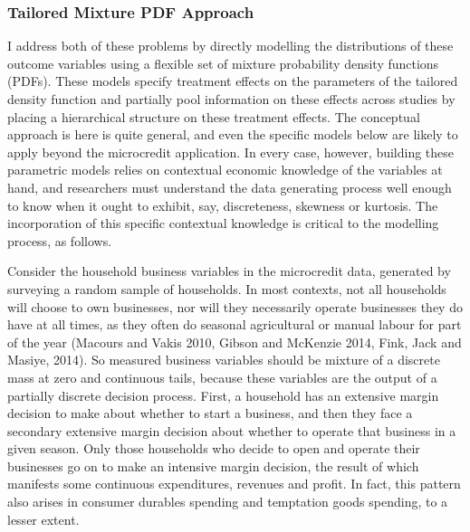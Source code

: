 \documentclass[english,12pt]{article}\usepackage{lmodern}
\numberwithin{equation}{section}
\begin{document}
\subsubsection{Tailored Mixture PDF Approach}
I address both of these problems by directly modelling the distributions of these outcome variables using a flexible set of mixture probability density functions (PDFs). These models specify treatment effects on the parameters of the tailored density function and partially pool information on these effects across studies by placing a hierarchical structure on these treatment effects. The conceptual approach is here is quite general, and even the specific models below are likely to apply beyond the microcredit application. In every case, however, building these parametric models relies on contextual economic knowledge of the variables at hand, and researchers must understand the data generating process well enough to know when it ought to exhibit, say, discreteness, skewness or kurtosis. The incorporation of this specific contextual knowledge is critical to the modelling process, as follows. 

Consider the household business variables in the microcredit data, generated by surveying a random sample of households. In most contexts, not all households will choose to own businesses, nor will they necessarily operate businesses they do have at all times, as they often do seasonal agricultural or manual labour for part of the year (Macours and Vakis 2010, Gibson and McKenzie 2014, Fink, Jack and Masiye, 2014). So measured business variables should be mixture of a discrete mass at zero and continuous tails, because these variables are the output of a partially discrete decision process. First, a household has an extensive margin decision to make about whether to start a business, and then they face a secondary extensive margin decision about whether to operate that business in a given season. Only those households who decide to open and operate their businesses go on to make an intensive margin decision, the result of which manifests some continuous expenditures, revenues and profit. In fact, this pattern also arises in consumer durables spending and temptation goods spending, to a lesser extent.  
\end{document}
